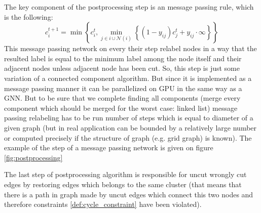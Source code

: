 \documentclass[10pt, twocolumn, a4paper]{article}
\theoremstyle{definition}
\begin{document}
\begin{figure*}[h]
    \caption{Illustration of the step of the message passing postprocessing network: colors and labels in nodes corresponds to the
        cluster of nodes: same color and label -- same cluster. Black edges is a uncut edges of the original graph $G$ and
        \textcolor{gray!80}{gray} -- cut edges of $G$. After a message passing step 3 nodes which have been connected by uncut edges
        changed their labels to the minimal label among the neighborhood. At the same time the node with label 4 didn't changed their label
        because it is not connected by uncut edge to any node with smaller label on this step. Also we denote with \textcolor{blue}{blue} color edge that became
        incident to nodes from the same cluster and therefore
        on the last step of the postprocessing algorithm will be restored.} \label{fig:postprocessing}
\end{figure*}

The key component of the postprocessing step is an message passing rule, which is the following:
\begin{equation} \label{def:postprocessing_mpn}
    c_i^{t+1} = \min \left\{ c_i^{t}, \min\limits_{j \in i \cup \mathcal{N}(i)} \left\{ (1 - y_{ij})c_j^{t} + y_{ij} \cdot \infty \right\}  \right\}
\end{equation}
This message passing network on every their step relabel nodes in a way that the resulted label is
equal to the minimum label among the node itself and their adjacent nodes unless adjacent node has been cut.
So, this step is just some variation of a connected component algorithm. But since it is implemented as a message passing
manner it can be parallelized on GPU in the same way as a GNN. But to be sure that we complete finding
all components (merge every component which should be merged for the worst case: linked list) message passing
relabeling has to be run number of steps which is equal to diameter of a given graph (but in real application can
be bounded by a relatively large number or computed precisely if the structure of graph (e.g. grid graph)
is known). The example of the step of a message passing network is given on figure \ref{fig:postprocessing}

The last step of postprocessing algorithm is responsible for uncut wrongly cut edges by restoring edges
which belongs to the same cluster (that means that there is a path in graph made by uncut edges which
connect this two nodes and therefore constraints \eqref{def:cycle_constraint} have been violated).
\end{document}
